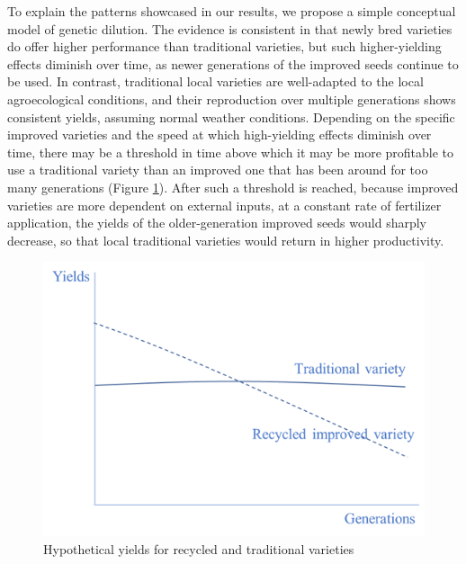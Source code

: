 \documentclass[11pt]{article}
\begin{document}
To explain the patterns showcased in our results, we propose a simple conceptual model of genetic dilution. The evidence is consistent in that newly bred varieties do offer higher performance than traditional varieties, but such higher-yielding effects diminish over time, as newer generations of the improved seeds continue to be used. In contrast, traditional local varieties are well-adapted to the local agroecological conditions, and their reproduction over multiple generations shows consistent yields, assuming normal weather conditions. Depending on the specific improved varieties and the speed at which high-yielding effects diminish over time, there may be a threshold in time above which it may be more profitable to use a traditional variety than an improved one that has been around for too many generations (Figure \ref{fig:generations}). After such a threshold is reached, because improved varieties are more dependent on external inputs, at a constant rate of fertilizer application, the yields of the older-generation improved seeds would sharply decrease, so that local traditional varieties would return in higher productivity.


\begin{figure}
    \centering
    \includegraphics[scale=0.7]{results/figures/generations.png}
    \caption{Hypothetical yields for recycled and traditional varieties}
    \label{fig:generations}
\end{figure}
\end{document}
